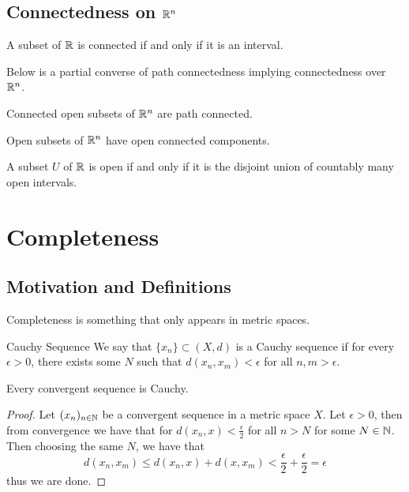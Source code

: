 \documentclass[a4paper]{article}
\begin{document}
\subsection{Connectedness on $\mathbb{R}^n$}
\begin{thm}{}{} A subset of $\mathbb{R}$ is connected if and only if it is an interval. 
\end{thm}

Below is a partial converse of path connectedness implying connectedness over $\mathbb{R}^n$. 

\begin{thm}{}{} Connected open subsets of $\mathbb{R}^n$ are path connected. 
\end{thm}

\begin{thm}{}{} Open subsets of $\mathbb{R}^n$ have open connected components. 
\end{thm}

\begin{thm}{}{} A subset $U$ of $\mathbb{R}$ is open if and only if it is the disjoint union of countably many open intervals. 
\end{thm}

\pagebreak
\section{Completeness}
\subsection{Motivation and Definitions}
Completeness is something that only appears in metric spaces. 
\begin{defn}{Cauchy Sequence}{} We say that $\{x_n\}\subset(X,d)$ is a Cauchy sequence if for every $\epsilon>0$, there exists some $N$ such that $d(x_n,x_m)<\epsilon$ for all $n,m>\epsilon$. 
\end{defn}

\begin{prp}{}{} Every convergent sequence is Cauchy. \tcbline
\begin{proof}
Let $(x_n)_{n\in\mathbb{N}}$ be a convergent sequence in a metric space $X$. Let $\epsilon>0$, then from convergence we have that for $d(x_n,x)<\frac{\epsilon}{2}$ for all $n>N$ for some $N\in\mathbb{N}$. Then choosing the same $N$, we have that $$d(x_n,x_m)\leq d(x_n,x)+d(x,x_m)<\frac{\epsilon}{2}+\frac{\epsilon}{2}=\epsilon$$ thus we are done. 
\end{proof}
\end{prp}
\end{document}
